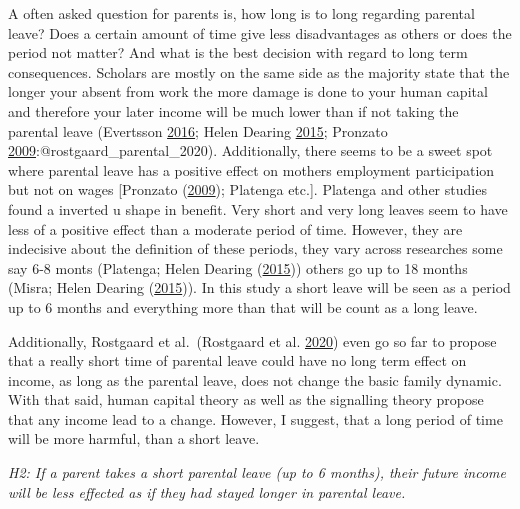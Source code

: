 \documentclass[
  12pt,
]{article}
\begin{document}
A often asked question for parents is, how long is to long regarding parental leave? Does a certain amount of time give less disadvantages as others or does the period not matter? And what is the best decision with regard to long term consequences.
Scholars are mostly on the same side as the majority state that the longer your absent from work the more damage is done to your human capital and therefore your later income will be much lower than if not taking the parental leave (Evertsson \protect\hyperlink{ref-evertsson_parental_2016}{2016}; Helen Dearing \protect\hyperlink{ref-helen_dearing_does_2015}{2015}; Pronzato \protect\hyperlink{ref-pronzato_return_2009}{2009}:@rostgaard\_parental\_2020). Additionally, there seems to be a sweet spot where parental leave has a positive effect on mothers employment participation but not on wages {[}Pronzato (\protect\hyperlink{ref-pronzato_return_2009}{2009}); Platenga etc.{]}. Platenga and other studies found a inverted u shape in benefit. Very short and very long leaves seem to have less of a positive effect than a moderate period of time.
However, they are indecisive about the definition of these periods, they vary across researches some say 6-8 monts (Platenga; Helen Dearing (\protect\hyperlink{ref-helen_dearing_does_2015}{2015})) others go up to 18 months (Misra; Helen Dearing (\protect\hyperlink{ref-helen_dearing_does_2015}{2015})). In this study a short leave will be seen as a period up to 6 months and everything more than that will be count as a long leave.

Additionally, Rostgaard et al.~(Rostgaard et al. \protect\hyperlink{ref-rostgaard_parental_2020}{2020}) even go so far to propose that a really short time of parental leave could have no long term effect on income, as long as the parental leave, does not change the basic family dynamic. With that said, human capital theory as well as the signalling theory propose that any income lead to a change. However, I suggest, that a long period of time will be more harmful, than a short leave.

\emph{H2: If a parent takes a short parental leave (up to 6 months), their future income will be less effected as if they had stayed longer in parental leave.}
\end{document}
